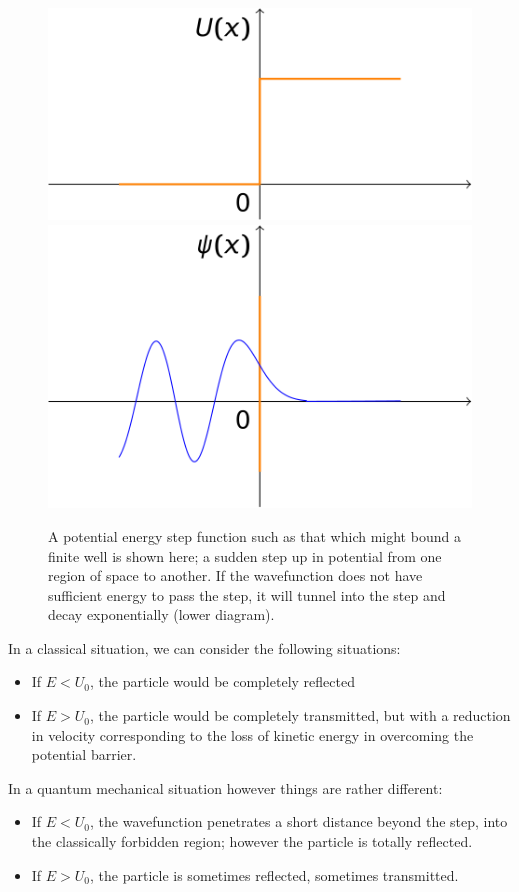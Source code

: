 \documentclass[
]{book}
\providecommand{\tightlist}{%
  \setlength{\itemsep}{0pt}\setlength{\parskip}{0pt}}
\begin{document}
\begin{figure}

{\centering \includegraphics[width=0.7\linewidth]{visualisations/LaTeX/ch18-pestep1} \includegraphics[width=0.7\linewidth]{visualisations/LaTeX/ch18-pestep2} 

}

\caption{A potential energy step function such as that which might bound a finite well is shown here; a sudden step up in potential from one region of space to another. If the wavefunction does not have sufficient energy to pass the step, it will tunnel into the step and decay exponentially (lower diagram).}\label{fig:ch18-reflectionparticlewave1}
\end{figure}

In a classical situation, we can consider the following situations:

\begin{itemize}
\tightlist
\item
  If \(E<U_0\), the particle would be completely reflected
\item
  If \(E>U_0\), the particle would be completely transmitted, but with a reduction in velocity corresponding to the loss of kinetic energy in overcoming the potential barrier.
\end{itemize}

In a quantum mechanical situation however things are rather different:

\begin{itemize}
\tightlist
\item
  If \(E<U_0\), the wavefunction penetrates a short distance beyond the step, into the classically forbidden region; however the particle is totally reflected.
\item
  If \(E>U_0\), the particle is sometimes reflected, sometimes transmitted.
\end{itemize}
\end{document}
